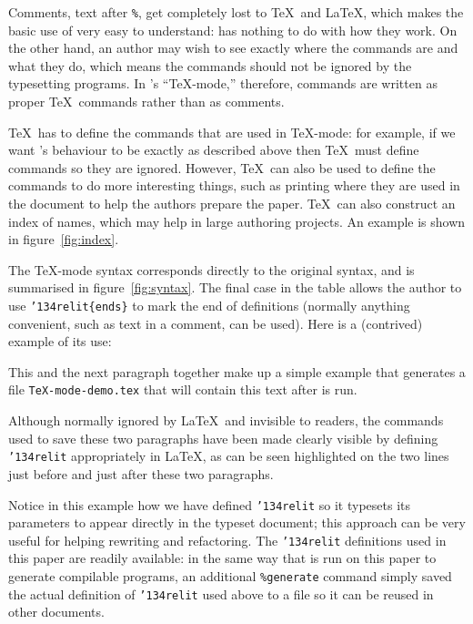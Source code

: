 \documentclass[prodmode,acmtecs]{acmsmall} %
\begin{document}
Comments, text after \texttt{\%}, get completely lost to \TeX\ and \LaTeX, which makes the basic use of  very easy to understand:  has nothing to do with how they work. On the other hand, an author may wish to see exactly where the  commands are and what they do, which means the commands should not be ignored by the typesetting programs. In 's ``\TeX-mode,'' therefore, commands are written as proper \TeX\ commands rather than as comments. 

\TeX\ has to define the  commands that are used in \TeX-mode: for example, if we want 's behaviour to be exactly as described above then \TeX\ must define  commands so they are ignored. However, \TeX\ can also be used to define the commands to do more interesting things, such as printing where they are used in the document to help the authors prepare the paper. \TeX\ can also construct an index of  names, which may help in large authoring projects. An example is shown in figure~\ref{fig:index}.

The \TeX-mode syntax corresponds directly to the original syntax, and is summarised in figure~\ref{fig:syntax}. The final case in the table allows the author to use \texttt{\char'134relit\{ends\}} to mark the end of definitions (normally anything convenient, such as text in a comment, can be used). Here is a (contrived) example of its use:

\label{tex-mode-example}
\indent This and the next paragraph together make up a simple example that generates a file \texttt{TeX-mode-demo.tex} that will contain this text after  is run. 

Although normally ignored by \LaTeX\ and invisible to readers, the  commands used to save these two paragraphs have been made clearly visible by defining {\tt \char'134relit} appropriately in \LaTeX, as can be seen highlighted on the two lines just before and just after these two paragraphs.

Notice in this example how we have defined \texttt{{\char'134}relit} so it typesets its parameters to appear directly in the typeset document; this approach can be very useful for helping rewriting and refactoring. The \texttt{{\char'134}relit} definitions used in this paper are readily available: in the same way that  is run on this paper to generate compilable programs, an additional \texttt{\%{}generate} command simply saved the actual definition of \texttt{{\char'134}relit} used above to a file so it can be reused in other documents.
\end{document}

